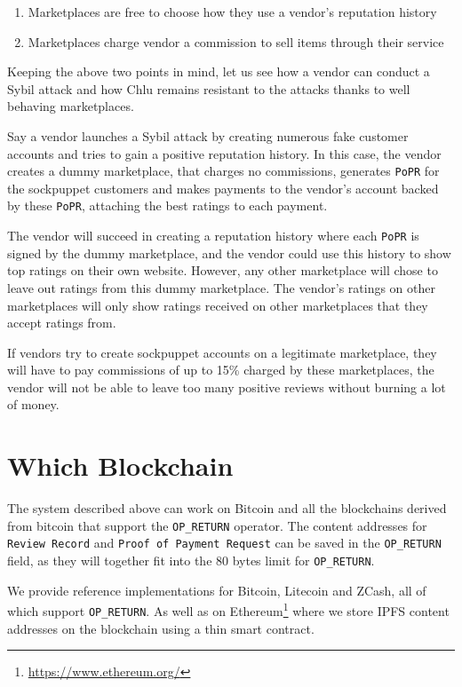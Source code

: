 \documentclass[a4paper]{article}
\begin{document}
\begin{enumerate}
\item Marketplaces are free to choose how they use a vendor's reputation
  history
\item Marketplaces charge vendor a commission to sell items through
  their service
\end{enumerate}

Keeping the above two points in mind, let us see how a vendor can
conduct a Sybil attack and how Chlu remains resistant to the attacks
thanks to well behaving marketplaces.

Say a vendor launches a Sybil attack by creating numerous fake
customer accounts and tries to gain a positive reputation history. In
this case, the vendor creates a dummy marketplace, that charges no
commissions, generates \texttt{PoPR} for the sockpuppet customers and
makes payments to the vendor's account backed by these \texttt{PoPR},
attaching the best ratings to each payment.

The vendor will succeed in creating a reputation history where each
\texttt{PoPR} is signed by the dummy marketplace, and the vendor could
use this history to show top ratings on their own website. However, any
other marketplace will chose to leave out ratings from this dummy
marketplace. The vendor's ratings on other marketplaces will only show
ratings received on other marketplaces that they accept ratings from.

If vendors try to create sockpuppet accounts on a legitimate
marketplace, they will have to pay commissions of up to 15\% charged
by these marketplaces, the vendor will not be able to leave too many
positive reviews without burning a lot of money.

\section{Which Blockchain}

The system described above can work on Bitcoin and all the blockchains
derived from bitcoin that support the \texttt{OP\_RETURN}
operator. The content addresses for \texttt{Review Record} and
\texttt{Proof of Payment Request} can be saved in the
\texttt{OP\_RETURN} field, as they will together fit into the 80 bytes
limit for \texttt{OP\_RETURN}.

We provide reference implementations for Bitcoin, Litecoin and ZCash,
all of which support \texttt{OP\_RETURN}. As well as on
Ethereum\footnote{\url{https://www.ethereum.org/}} where we store IPFS
content addresses on the blockchain using a thin smart contract.
\end{document}
